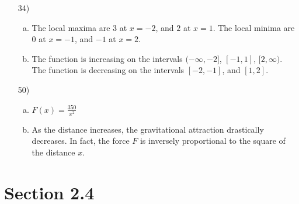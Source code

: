 \documentclass[fleqn]{article}
\begin{document}
\begin{enumerate}
\begin{enumerate}
\end{enumerate}

\item[34)]
\begin{enumerate}[(a)]
\item 
The local maxima are $3$ at $x = -2$, and $2$ at $x = 1$.
The local minima are $0$ at $x = -1$, and $-1$ at $x = 2$.

\item 
The function is increasing on the intervals $(-\infty, -2]$, $[-1, 1]$, $[2, \infty)$.
The function is decreasing on the intervals $[-2, -1]$, and $[1, 2]$.

\end{enumerate}

\item[50)]
\begin{enumerate}[(a)]
\item
$F(x) = \displaystyle \frac{350}{x^2}$ \\

\item
As the distance increases, the gravitational attraction drastically decreases. In fact, the force $F$ is inversely proportional to the square of the distance $x$.

\end{enumerate}

\end{enumerate}

\section{Section 2.4}
\end{document}
